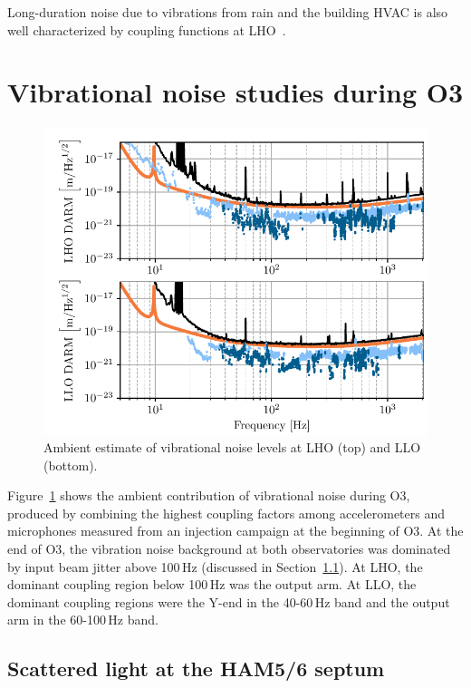 Long-duration noise due to vibrations from rain and the building \ac{HVAC} is also well characterized by coupling functions at \ac{LHO}~\citep{alog_rain, alog_hvac_coupling}.

\section{Vibrational noise studies during O3}\label{sec:vib}

\begin{figure}[h!]
	\centering
	\includegraphics[width=\textwidth]{figures/noise-studies/vib-ambient.pdf}
	\caption{
		Ambient estimate of vibrational noise levels at LHO (top) and LLO (bottom).}
	\label{fig:vib-ambient}
\end{figure}

Figure~\ref{fig:vib-ambient} shows the ambient contribution of vibrational noise during \ac{O3}, produced by combining the highest coupling factors among accelerometers and microphones measured from an injection campaign at the beginning of \ac{O3}.
At the end of \ac{O3}, the vibration noise background at both observatories was dominated by input beam jitter above 100\,Hz (discussed in Section~\ref{sec:vib-septum}).
At \ac{LHO},  the dominant coupling region below 100\,Hz was the output arm.
At \ac{LLO}, the dominant coupling regions were the Y-end in the 40-60\,Hz band and the output arm in the 60-100\,Hz band.

\subsection{Scattered light at the HAM5/6 septum}\label{sec:vib-septum}


